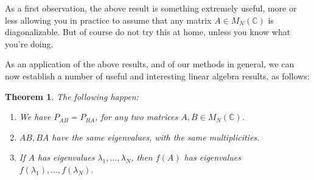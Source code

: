 \documentclass[12pt]{amsbook}
\newtheorem{theorem}{Theorem}[chapter]
\begin{document}
As a first observation, the above result is something extremely useful, more or less allowing you in practice to assume that any matrix $A\in M_N(\mathbb C)$ is diagonalizable. But of course do not try this at home, unless you know what you're doing. 

\bigskip

As an application of the above results, and of our methods in general, we can now establish a number of useful and interesting linear algebra results, as follows:


\begin{theorem}
The following happen:
\begin{enumerate}
\item We have $P_{AB}=P_{BA}$, for any two matrices $A,B\in M_N(\mathbb C)$.

\item $AB,BA$ have the same eigenvalues, with the same multiplicities.

\item If $A$ has eigenvalues $\lambda_1,\ldots,\lambda_N$, then $f(A)$ has eigenvalues $f(\lambda_1),\ldots,f(\lambda_N)$.
\end{enumerate}
\end{theorem}
\end{document}
